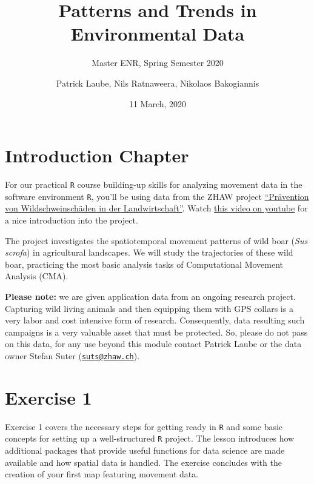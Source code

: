 \documentclass[]{book}
\title{Patterns and Trends in Environmental Data}
\subtitle{Master ENR, Spring Semester 2020}
\author{Patrick Laube, Nils Ratnaweera, Nikolaos Bakogiannis}
\date{11 March, 2020}
\begin{document}
\maketitle

{
\setcounter{tocdepth}{1}
\tableofcontents
}
\hypertarget{introduction-chapter}{%
\chapter*{Introduction Chapter}\label{introduction-chapter}}

For our practical \texttt{R} course building-up skills for analyzing movement data in the software environment \texttt{R}, you'll be using data from the ZHAW project \href{https://www.zhaw.ch/de/ueber-uns/aktuell/news/detailansicht-news/event-news/wildschweinschaeden-mit-akustischer-methode-verhindern/}{``Prävention von Wildschweinschäden in der Landwirtschaft''}. Watch \href{https://youtu.be/WYXnCQMfPiI}{this video on youtube} for a nice introduction into the project.

The project investigates the spatiotemporal movement patterns of wild boar (\emph{Sus scrofa}) in agricultural landscapes. We will study the trajectories of these wild boar, practicing the most basic analysis tasks of Computational Movement Analysis (CMA).

\textbf{Please note:} we are given application data from an ongoing research project. Capturing wild living animals and then equipping them with GPS collars is a very labor and cost intensive form of research. Consequently, data resulting such campaigns is a very valuable asset that must be protected. So, please do not pass on this data, for any use beyond this module contact Patrick Laube or the data owner Stefan Suter (\href{mailto:suts@zhaw.ch}{\nolinkurl{suts@zhaw.ch}}).

\hypertarget{exercise-1}{%
\chapter{Exercise 1}\label{exercise-1}}

Exercise 1 covers the necessary steps for getting ready in \texttt{R} and some basic concepts for setting up a well-structured \texttt{R} project. The lesson introduces how additional packages that provide useful functions for data science are made available and how spatial data is handled. The exercise concludes with the creation of your first map featuring movement data.
\end{document}
